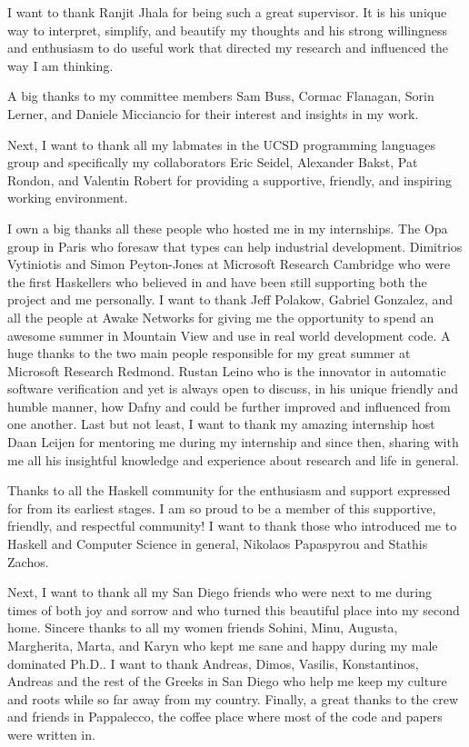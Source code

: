 I want to thank Ranjit Jhala for being such a great supervisor. 
%
It is his unique way to interpret, simplify, and beautify my 
thoughts
and his strong willingness and enthusiasm to do useful work 
that directed my research and influenced the way I am thinking. 

A big thanks to my committee members 
Sam Buss, 
Cormac Flanagan,
Sorin Lerner, 
and Daniele Micciancio for their interest and insights in my work. 

Next, I want to thank all my labmates in the UCSD programming languages group and specifically my 
collaborators
Eric Seidel, 
Alexander Bakst,
Pat Rondon, and 
Valentin Robert
for providing a supportive, friendly, and inspiring working environment.

I own a big thanks all these people who hosted me in my internships. 
%
The Opa group in Paris who foresaw that types can help industrial development.
%
Dimitrios Vytiniotis and Simon Peyton-Jones
at Microsoft Research Cambridge
who were the first Haskellers who believed in \toolname
and have been still supporting both the project and me personally.
%
I want to thank Jeff Polakow, Gabriel Gonzalez, and all the people at Awake Networks 
for giving me the opportunity to spend an awesome summer in Mountain View 
and use \toolname in real world development code. 
%
A huge thanks to the two main people responsible for my great summer at 
Microsoft Research Redmond.
%
Rustan Leino who is the innovator in automatic software verification
and yet is always open to discuss, in his unique friendly and humble manner, 
how Dafny and \toolname could be further improved and influenced from one another. 
% 
Last but not least, I want to thank my amazing internship host
Daan Leijen for mentoring me during my internship and since then, 
sharing with me all his insightful knowledge and experience 
about research and life in general.

Thanks to all the Haskell community 
for the enthusiasm and support expressed for \toolname 
from its earliest stages. 
%
I am so proud to be a member of this 
supportive, friendly, and respectful
community! 
%
I want to thank those who introduced me to 
Haskell and Computer Science in general, 
Nikolaos Papaspyrou and Stathis Zachos. 


Next, I want to thank all my San Diego friends who were next to me 
during times of both joy and sorrow and 
who turned this beautiful place into 
my second home.
% 
Sincere thanks to all my women friends
Sohini, Minu, Augusta, Margherita, Marta, and Karyn
who kept me sane and happy during my male dominated Ph.D..
%
I want to thank 
Andreas, Dimos, Vasilis, Konstantinos, Andreas
and the rest of the Greeks in San Diego who help me 
keep my culture and roots while so far away from my country.
%
Finally, a great thanks to the crew and friends in Pappalecco, 
the coffee place where most of the \toolname code and papers were written in. 


